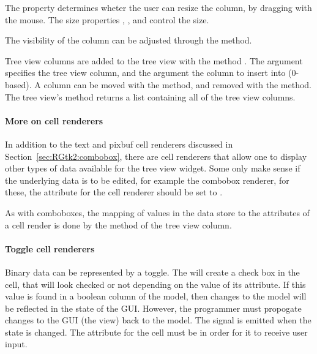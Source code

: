 The property  determines wheter the user can resize
the column, by dragging with the mouse. The size properties
, , and  control the
size.

The visibility of the column can be adjusted through the
 method. 


Tree view columns are added to the tree view with the
method . The
 argument specifies the tree
view column, and the 
argument the column to insert into ($0$-based). A column can be moved
with the  method, and removed
with the  method. The tree view's
 method returns a list containing all
of the tree view columns.

\paragraph{More on cell renderers}

In addition to the text and pixbuf cell renderers discussed in
Section~\ref{sec:RGtk2:combobox}, there are cell renderers that allow
one to display other types of data available for the tree view widget.
Some only make sense if the underlying data is to be edited, for
example the combobox renderer, for these, the 
attribute for the cell renderer
should be set to .


As with comboboxes, the mapping of values in the data store to the
attributes of a cell render is done by the
 method of the tree view column.


\paragraph{Toggle cell renderers}
Binary data can be represented by a toggle. The
 will create a check box in the
cell, that  will look checked or not depending on the value of its
 attribute. If this value is found in a boolean column of
the model, then changes to the model will be reflected in the state of
the GUI. However, the programmer must propogate changes to the GUI (the
view) back to the model. The  signal is emitted when
the state is changed. The  attribute for the cell
must be  in order for it to receive user input.

